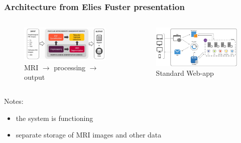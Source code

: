 \documentclass{beamer}
\begin{document}
\begin{frame}
\frametitle{Architecture from Elies Fuster presentation}
\begin{columns}
	\begin{column}{0.5\textwidth}
		\begin{figure}
			\centering
			\includegraphics[width=\textwidth]{images/elies_1.png}
			\caption{MRI $\rightarrow$ processing $\rightarrow$ output}
		\end{figure}
	\end{column}
	\begin{column}{0.5\textwidth}
		\begin{figure}
			\centering
			\includegraphics[width=\textwidth]{images/elies_2.png}
			\caption{Standard Web-app}
		\end{figure}
	\end{column}
\end{columns}
Notes:
\begin{itemize}
	\item the system is functioning
	\item separate storage of MRI images and other data
\end{itemize}
\end{frame}
\end{document}
